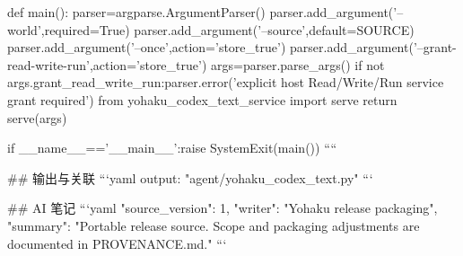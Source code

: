 def main():
    parser=argparse.ArgumentParser()
    parser.add_argument('--world',required=True)
    parser.add_argument('--source',default=SOURCE)
    parser.add_argument('--once',action='store_true')
    parser.add_argument('--grant-read-write-run',action='store_true')
    args=parser.parse_args()
    if not args.grant_read_write_run:parser.error('explicit host Read/Write/Run service grant required')
    from yohaku_codex_text_service import serve
    return serve(args)

if __name__=='__main__':raise SystemExit(main())
````

## 输出与关联
```yaml
output: "agent/yohaku_codex_text.py"
```

## AI 笔记
```yaml
{"source_version": 1, "writer": "Yohaku release packaging", "summary": "Portable release source. Scope and packaging adjustments are documented in PROVENANCE.md."}
```
